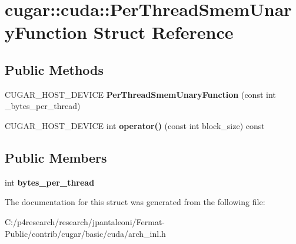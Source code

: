 \hypertarget{structcugar_1_1cuda_1_1_per_thread_smem_unary_function}{}\section{cugar\+:\+:cuda\+:\+:Per\+Thread\+Smem\+Unary\+Function Struct Reference}
\label{structcugar_1_1cuda_1_1_per_thread_smem_unary_function}
\subsection*{Public Methods}
\begin{DoxyCompactItemize}
\item 
\mbox{\label{structcugar_1_1cuda_1_1_per_thread_smem_unary_function_abb4e26494239066de05512e986595063}} 
C\+U\+G\+A\+R\+\_\+\+H\+O\+S\+T\+\_\+\+D\+E\+V\+I\+CE {\bfseries Per\+Thread\+Smem\+Unary\+Function} (const int \+\_\+bytes\+\_\+per\+\_\+thread)
\item 
\mbox{\label{structcugar_1_1cuda_1_1_per_thread_smem_unary_function_a2d60f8b45bfcb778418fff83f98152ae}} 
C\+U\+G\+A\+R\+\_\+\+H\+O\+S\+T\+\_\+\+D\+E\+V\+I\+CE int {\bfseries operator()} (const int block\+\_\+size) const
\end{DoxyCompactItemize}
\subsection*{Public Members}
\begin{DoxyCompactItemize}
\item 
\mbox{\label{structcugar_1_1cuda_1_1_per_thread_smem_unary_function_ab1a45200fa7355f47a4386694decf72f}} 
int {\bfseries bytes\+\_\+per\+\_\+thread}
\end{DoxyCompactItemize}


The documentation for this struct was generated from the following file\+:\begin{DoxyCompactItemize}
\item 
C\+:/p4research/research/jpantaleoni/\+Fermat-\/\+Public/contrib/cugar/basic/cuda/arch\+\_\+inl.\+h\end{DoxyCompactItemize}
